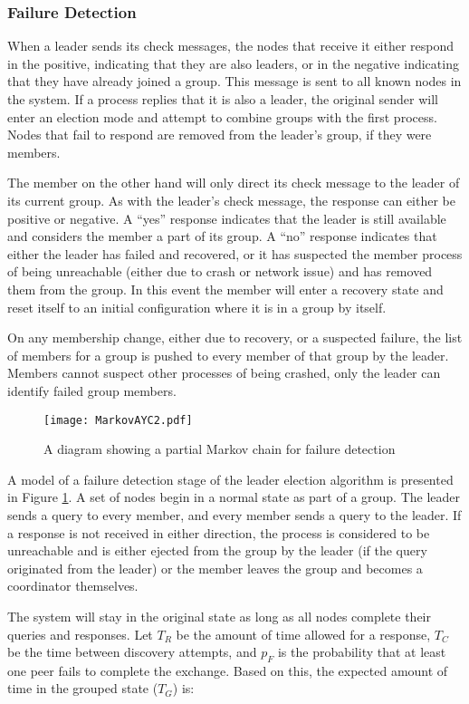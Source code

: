 \subsubsection{Failure Detection}
When a leader sends its check messages, the nodes that receive it either
respond in the positive, indicating that they are also leaders, or in the
negative indicating that they have already joined a group. This message is sent
to all known nodes in the system. If a process replies that it is also a
leader, the original sender will enter an election mode and attempt to combine
groups with the first process. Nodes that fail to respond are removed from the
leader's group, if they were members.

The member on the other hand will only direct its check message to the leader
of its current group. As with the leader's check message, the response can
either be positive or negative. A ``yes'' response indicates that the leader is
still available and considers the member a part of its group. A ``no'' response
indicates that either the leader has failed and recovered, or it has suspected
the member process of being unreachable (either due to crash or network issue)
and has removed them from the group. In this event the member will enter a
recovery state and reset itself to an initial configuration where it is in a
group by itself.

On any membership change, either due to recovery, or a suspected failure, the
list of members for a group is pushed to every member of that group by the
leader. Members cannot suspect other processes of being crashed, only the
leader can identify failed group members.

\begin{figure}
\centering
\texttt{[image: MarkovAYC2.pdf]}
\caption{A diagram showing a partial Markov chain for failure detection}
\label{fig:MARKOVAYC}
\end{figure}

A model of a failure detection stage of the leader election algorithm is presented in
Figure \ref{fig:MARKOVAYC}. A set of nodes begin in a normal state as part of a group.
The leader sends a query to every member, and every member sends a query to the leader.
If a response is not received in either direction, the process is considered to be
unreachable and is either ejected from the group by the leader (if the query originated from the leader)
or the member leaves the group and becomes a coordinator themselves.

The system will stay in the original state as long as all nodes complete their queries and responses.
Let $T_{R}$ be the amount of time allowed for a response, $T_{C}$ be the time between
discovery attempts, and $p_{F}$ is the probability that at least one peer fails to complete the exchange.
Based on this, the expected amount of time in the grouped state ($T_{G}$) is:

